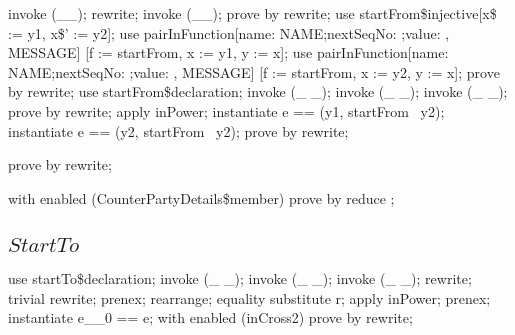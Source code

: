 \begin{LPScript}\begin{zproof}[gMESSAGEStartFromPInjType]
    invoke (\_\pinj \_);
    rewrite;
    invoke (\_\pfun \_);
    prove by rewrite;
    use startFrom\$injective[x\$ := y1, x\$' := y2];
    use pairInFunction[\lblot name: NAME;nextSeqNo: \nat;value: \nat \rblot, MESSAGE]
                          [f := startFrom, x := y1, y := x];
    use pairInFunction[\lblot name: NAME;nextSeqNo: \nat;value: \nat \rblot, MESSAGE]
                          [f := startFrom, x := y2, y := x];
    prove by rewrite;
    use startFrom\$declaration;
    invoke (\_ \fun \_);
    invoke (\_ \pfun \_);
    invoke (\_ \rel \_);
    prove by rewrite;
    apply inPower;
    instantiate e == (y1, startFrom~ y2);
    instantiate e == (y2, startFrom~ y2);
    prove by rewrite;
\end{zproof}\end{LPScript}

\begin{LDCheck}\begin{zproof}
   prove by rewrite;
\end{zproof}\end{LDCheck}

\begin{LDCheck}\begin{zproof}
   with enabled (CounterPartyDetails\$member) prove by reduce ;
\end{zproof}\end{LDCheck}

\subsection{$StartTo$}

\begin{LPScript}\begin{zproof}[gMESSAGEStartToRelType]
    use startTo\$declaration;
    invoke (\_ \fun \_);
    invoke (\_ \pfun \_);
    invoke (\_ \rel \_);
    rewrite;
    trivial rewrite;
    prenex;
    rearrange;
    equality substitute r;
    apply inPower;
    prenex;
    instantiate e\_\_0 == e;
    with enabled (inCross2) prove by rewrite;
\end{zproof}\end{LPScript}

